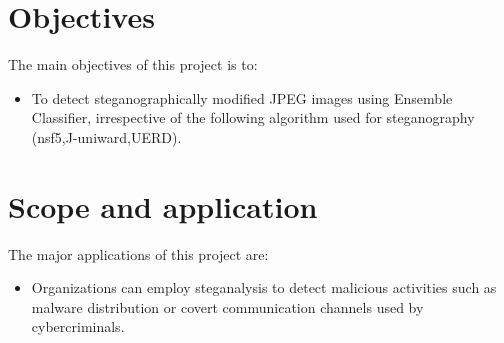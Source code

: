 \section{Objectives}
The main objectives of this project is to:
\begin{itemize}
\item  To detect steganographically modified JPEG images using Ensemble \mbox{Classifier}, irrespective of the following algorithm used for steganography (nsf5,J-uniward,UERD). 
\end{itemize}
\section{Scope and application}
The major applications of this project are:
\begin{itemize}
    \item Organizations can employ steganalysis to detect malicious activities such as malware distribution or covert communication channels used by cybercriminals.
\end{itemize}

